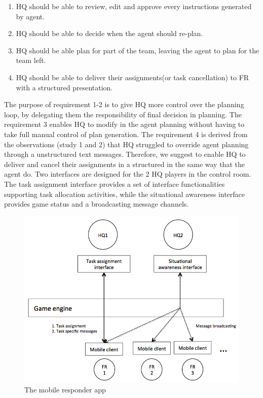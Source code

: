 \begin{enumerate}
\item HQ should be able to review, edit and approve every instructions generated by agent.
\item HQ should be able to decide when the agent should re-plan. 
\item HQ should be able plan for part of the team, leaving the agent to plan for the team left. 
\item HQ should be able to deliver their assignments(or task cancellation) to FR with a structured presentation. 
\end{enumerate}

The purpose of requirement 1-2 is to give HQ more control over the planning loop, by delegating them the responsibility of final decision in planning. The requirement 3 enables HQ to modify in the agent planning without having to take full manual control of plan generation. The requirement 4 is derived from the observations (study 1 and 2) that HQ struggled to override agent planning through a unstructured text messages. Therefore, we suggest to enable HQ to deliver and cancel their assignments in a structured in the same way that the agent do. Two interfaces are designed for the 2 HQ players in the control room. The task assignment interface provides a set of interface functionalities supporting task allocation activities, while the situational awareness interface provides game status and a broadcasting message channels.  \\

\begin{figure}[h]
  \centering
  \includegraphics[width=1\textwidth]{img/study3/system/Interfaces}
  \caption{The mobile responder app}
  \label{fig:mobileResponderApp}
\end{figure}

